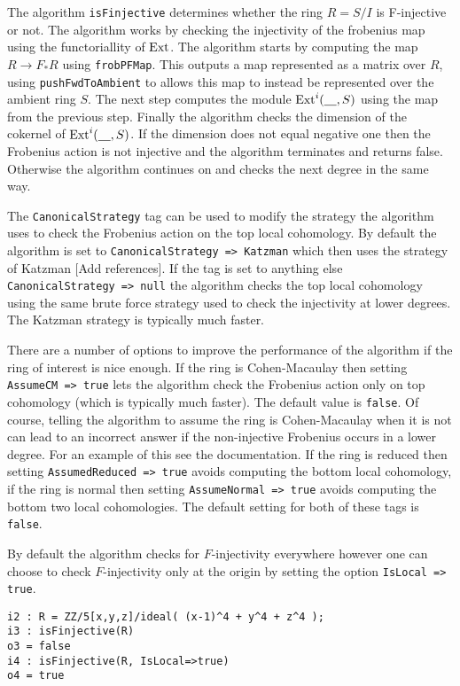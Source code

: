 \documentclass[11pt]{amsart}
\begin{document}
The algorithm {\tt isFinjective} determines whether the ring  $R = S/I$ is F-injective or not. The algorithm works by checking the injectivity of the frobenius map using the functoriallity of $\operatorname{Ext}$.  The algorithm starts by computing  the map $R \rightarrow F_{*}R$ using {\tt frobPFMap}. This outputs a map represented as a matrix over $R$, using {\tt pushFwdToAmbient} to allows this map to instead be represented over the ambient ring $S$. The next step computes the module $\operatorname{Ext}^{i}( \underline{\hskip 10pt}, S)$ using the map from the previous step. Finally the algorithm checks the dimension of the cokernel of  $\operatorname{Ext}^{i}( \underline{\hskip 10pt}, S)$. If the dimension does not equal negative one then the Frobenius action is not injective and the algorithm terminates and returns false. Otherwise the algorithm continues on and checks the next degree in the same way.

The {\tt CanonicalStrategy} tag can be used to modify the strategy the algorithm uses to check the Frobenius action on the top local cohomology. By default the algorithm is set to {\tt CanonicalStrategy => Katzman} which then uses the strategy of Katzman  {\hfill\large\color{red} [Add references]}. If the tag is set to anything else {\tt CanonicalStrategy => null} the algorithm checks the top local cohomology using the same brute force strategy used to check the injectivity at lower degrees. The Katzman strategy is typically much faster.

There are a number of options to improve the performance of the algorithm if the ring of interest is nice enough. If the ring is Cohen-Macaulay then setting {\tt AssumeCM => true} lets the algorithm check the Frobenius action only on top cohomology (which is typically much faster).  The default value is {\tt false}. Of course, telling the algorithm to assume the ring is Cohen-Macaulay when it is not can lead to an incorrect answer if the non-injective Frobenius occurs in a lower degree. For an example of this see the documentation.  If the ring is reduced then setting {\tt AssumedReduced => true} avoids computing the bottom local cohomology, if the ring is normal then setting {\tt AssumeNormal => true} avoids computing the bottom two local cohomologies. The default setting for both of these tags is {\tt false}.

By default the algorithm checks for $F$-injectivity everywhere however one can choose to check $F$-injectivity only at the origin by setting the option {\tt IsLocal => true}.
\begin{verbatim}
i2 : R = ZZ/5[x,y,z]/ideal( (x-1)^4 + y^4 + z^4 );
i3 : isFinjective(R)
o3 = false
i4 : isFinjective(R, IsLocal=>true)
o4 = true
\end{verbatim}
\end{document}
